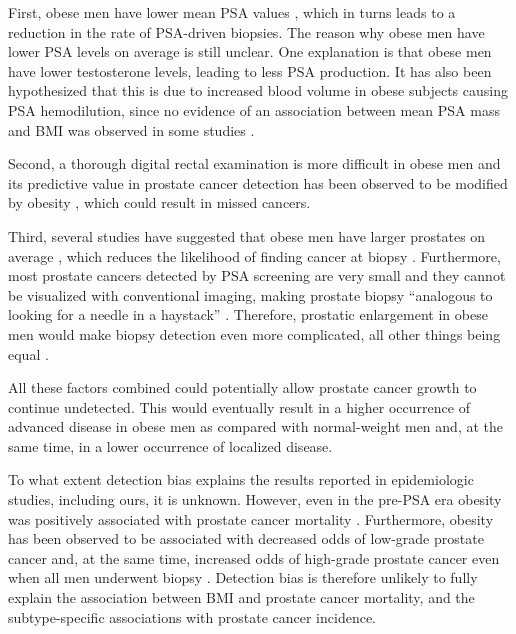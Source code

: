 First, obese men have lower mean PSA values \citep{banez_obesityrelated_2007}, which in turns leads to a reduction in the rate of PSA-driven biopsies. The reason why obese men have lower PSA levels on average is still unclear. One explanation is that obese men have lower testosterone levels, leading to less PSA production. It has also been hypothesized that this is due to increased blood volume in obese subjects causing PSA hemodilution, since no evidence of an association between mean PSA mass and BMI was observed in some studies \citep{banez_obesityrelated_2007, grubb_serum_2009}. 

Second, a thorough digital rectal examination is more difficult in obese men and its predictive value in prostate cancer detection has been observed to be modified by obesity \citep{chu_predictive_2011}, which could result in missed cancers.

Third, several studies have suggested that obese men have larger prostates on average \citep{dahle_body_2002, freedland_obesity_2006}, which reduces the likelihood of finding cancer at biopsy \citep{freedland_obesity_2006}. Furthermore, most prostate cancers detected by PSA screening are very small and they cannot be visualized with conventional imaging, making prostate biopsy ``analogous to looking for a needle in a haystack'' \citep{buschemeyer_obesity_2007}. Therefore, prostatic enlargement in obese men would make biopsy detection even more complicated, all other things being equal \citep{kranse_predictors_1999}. 

All these factors combined could potentially allow prostate cancer growth to continue undetected. This would eventually result in  a higher occurrence of advanced disease in obese men as compared with normal-weight men and, at the same time, in a lower occurrence of localized disease.

To what extent detection bias explains the results reported in epidemiologic studies, including ours, it is unknown. However, even in the pre-PSA era obesity  was positively associated with prostate cancer mortality \citep{rodriguez_body_2001}. Furthermore, obesity has been observed to be associated with decreased odds of low-grade prostate cancer and, at the same time, increased odds of high-grade prostate cancer even when all men underwent biopsy \citep{gong_obesity_2006}. Detection bias is therefore unlikely to fully explain the association between BMI and prostate cancer mortality, and the subtype-specific associations with prostate cancer incidence.

